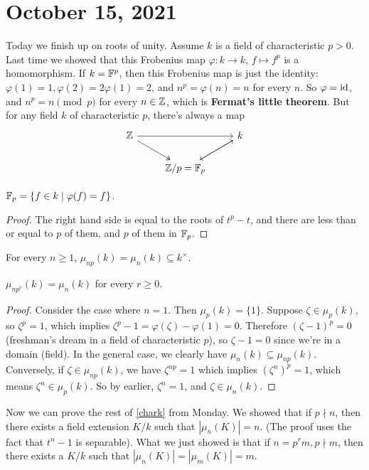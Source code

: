 \section{October 15, 2021} 
Today we finish up on roots of unity. Assume $k$ is a field of characteristic $p>0$. Last time we showed that this Frobenius map $\varphi   \colon k \to k$, $f \mapsto  f^p$ is a homomorphism. If $k=\mathbb{F}^p$, then this Frobenius map is just the identity: $\varphi (1)= 1, \varphi (2)=2\varphi (1)=2$, and $n^p=\varphi (n)=n$ for every $n$. So $\varphi =\operatorname{id}$, and $n^p=n \pmod p$ for every $n \in \mathbb{Z}$, which is \textbf{Fermat's little theorem}. But for any field $k$ of characteristic $p$, there's always a map \[
\begin{tikzcd}
\Z \arrow[rr] \arrow[rd, two heads] &                        & k \arrow[ld] \\
                                    & \Z /p =\F_p \arrow[ru] &             
\end{tikzcd}
\] 
\begin{claim}
    $\mathbb{F}_p = \{f \in k \mid \varphi (f)=f\} $.
\end{claim}
\begin{proof}
    The right hand side is equal to the roots of $t^p-t$, and there are less than or equal to $p$ of them, and $p$ of them in $\mathbb{F}_p$.
\end{proof}
\begin{lemma}
    For every $n\geq 1$, $\mu _{np}(k)=\mu _n (k) \subseteq  k ^{\times }$.
\end{lemma}
\begin{cor}
    $\mu _{np ^r}(k)=\mu _n (k)$ for every $r \geq 0$.
\end{cor}
\begin{proof}
    Consider the case where $n=1$. Then $\mu_p(k)= \{1\} $. Suppose $\zeta \in \mu_p(k)$, so $\zeta ^p=1$, which implies $\zeta^p-1=\varphi (\zeta)-\varphi (1)=0$. Therefore $(\zeta-1)^p=0$ (freshman's dream in a field of characteristic $p$), so $\zeta-1=0$ since we're in a domain (field). In the general case, we clearly have $\mu_n (k) \subseteq \mu_{np}(k)$. Conversely, if $\zeta \in \mu _{np}(k)$, we have $\zeta ^{np}=1$ which implies $(\zeta ^n )^p=1$, which means $\zeta ^n  \in \mu_p(k)$. So by earlier, $\zeta ^n =1$, and $\zeta \in \mu _n (k)$.
\end{proof}
Now we can prove the rest of \cref{chark} from Monday. We showed that if $p \nmid n$, then there exists a field extension $K /k$ such that $| \mu _n (K)|=n$. (The proof uses the fact that $t ^n -1$ is separable). What we just showed is that if $n=p^rm, p\nmid m$, then there exists a $K /k$ such that $|\mu_n (K)|=|\mu_m(K)|=m$.


